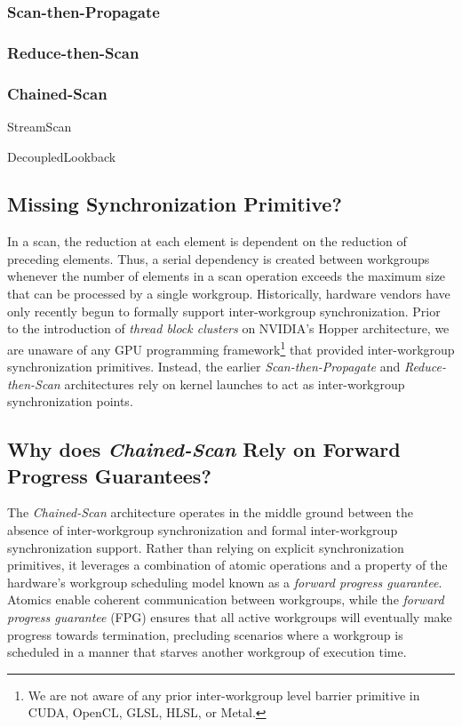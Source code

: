 \documentclass[sigconf]{acmart}
\begin{document}
\subsubsection{Scan-then-Propagate}
\subsubsection{Reduce-then-Scan}
\subsubsection{Chained-Scan}

 StreamScan

 DecoupledLookback

\subsection{Missing Synchronization Primitive?}
 In a scan, the reduction at each element is dependent on the reduction of preceding elements. Thus, a serial dependency is created between workgroups whenever the number of elements in a scan operation exceeds the maximum size that can be processed by a single workgroup. Historically, hardware vendors have only recently begun to formally support inter-workgroup synchronization. Prior to the introduction of \emph{thread block clusters} on NVIDIA's Hopper architecture\cite{}, we are unaware of any GPU programming framework\footnote{We are not aware of any prior inter-workgroup level barrier primitive in CUDA, OpenCL, GLSL, HLSL, or Metal.} that provided inter-workgroup synchronization primitives. Instead, the earlier \emph{Scan-then-Propagate} and \emph{Reduce-then-Scan} architectures rely on kernel launches to act as inter-workgroup synchronization points\cite{}. 

\subsection{Why does \emph{Chained-Scan} Rely on Forward Progress Guarantees?}
 The \emph{Chained-Scan} architecture operates in the middle ground between the absence of inter-workgroup synchronization and formal inter-workgroup synchronization support. Rather than relying on explicit synchronization primitives, it leverages a combination of atomic operations and a property of the hardware's workgroup scheduling model known as a \emph{forward progress guarantee}. Atomics enable coherent communication between workgroups, while the \emph{forward progress guarantee} (FPG) ensures that all active workgroups will eventually make progress towards termination, precluding scenarios where a workgroup is scheduled in a manner that starves another workgroup of execution time.
 
\end{document}

